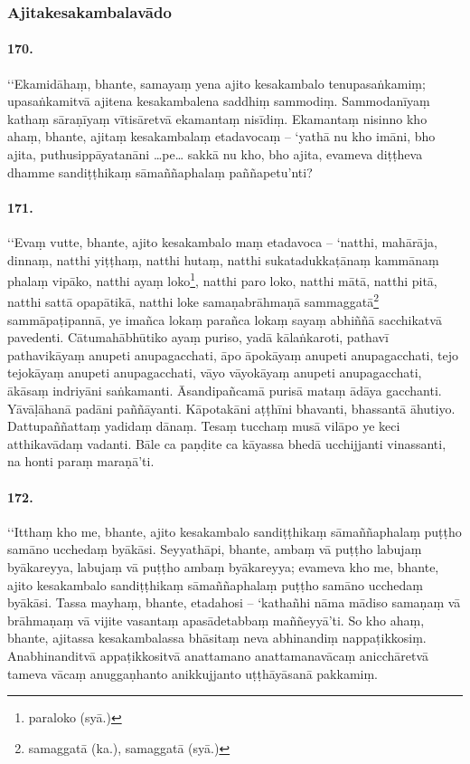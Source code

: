 \subsubsection{Ajitakesakambalavādo}

\paragraph{170.} ‘‘Ekamidāhaṃ, bhante, samayaṃ yena ajito kesakambalo tenupasaṅkamiṃ; upasaṅkamitvā ajitena kesakambalena saddhiṃ sammodiṃ. Sammodanīyaṃ kathaṃ sāraṇīyaṃ vītisāretvā ekamantaṃ nisīdiṃ. Ekamantaṃ nisinno kho ahaṃ, bhante, ajitaṃ kesakambalaṃ etadavocaṃ – ‘yathā nu kho imāni, bho ajita, puthusippāyatanāni …pe… sakkā nu kho, bho ajita, evameva diṭṭheva dhamme sandiṭṭhikaṃ sāmaññaphalaṃ paññapetu’nti?

\paragraph{171.} ‘‘Evaṃ vutte, bhante, ajito kesakambalo maṃ etadavoca – ‘natthi, mahārāja, dinnaṃ, natthi yiṭṭhaṃ, natthi hutaṃ, natthi sukatadukkaṭānaṃ kammānaṃ phalaṃ vipāko, natthi ayaṃ loko\footnote{paraloko (syā.)}, natthi paro loko, natthi mātā, natthi pitā, natthi sattā opapātikā, natthi loke samaṇabrāhmaṇā sammaggatā\footnote{samaggatā (ka.), samaggatā (syā.)} sammāpaṭipannā, ye imañca lokaṃ parañca lokaṃ sayaṃ abhiññā sacchikatvā pavedenti. Cātumahābhūtiko ayaṃ puriso, yadā kālaṅkaroti, pathavī pathavikāyaṃ anupeti anupagacchati, āpo āpokāyaṃ anupeti anupagacchati, tejo tejokāyaṃ anupeti anupagacchati, vāyo vāyokāyaṃ anupeti anupagacchati, ākāsaṃ indriyāni saṅkamanti. Āsandipañcamā purisā mataṃ ādāya gacchanti. Yāvāḷāhanā padāni paññāyanti. Kāpotakāni aṭṭhīni bhavanti, bhassantā āhutiyo. Dattupaññattaṃ yadidaṃ dānaṃ. Tesaṃ tucchaṃ musā vilāpo ye keci atthikavādaṃ vadanti. Bāle ca paṇḍite ca kāyassa bhedā ucchijjanti vinassanti, na honti paraṃ maraṇā’ti.

\paragraph{172.} ‘‘Itthaṃ kho me, bhante, ajito kesakambalo sandiṭṭhikaṃ sāmaññaphalaṃ puṭṭho samāno ucchedaṃ byākāsi. Seyyathāpi, bhante, ambaṃ vā puṭṭho labujaṃ byākareyya, labujaṃ vā puṭṭho ambaṃ byākareyya; evameva kho me, bhante, ajito kesakambalo sandiṭṭhikaṃ sāmaññaphalaṃ puṭṭho samāno ucchedaṃ byākāsi. Tassa mayhaṃ, bhante, etadahosi – ‘kathañhi nāma mādiso samaṇaṃ vā brāhmaṇaṃ vā vijite vasantaṃ apasādetabbaṃ maññeyyā’ti. So kho ahaṃ, bhante, ajitassa kesakambalassa bhāsitaṃ neva abhinandiṃ nappaṭikkosiṃ. Anabhinanditvā appaṭikkositvā anattamano anattamanavācaṃ anicchāretvā tameva vācaṃ anuggaṇhanto anikkujjanto uṭṭhāyāsanā pakkamiṃ.

